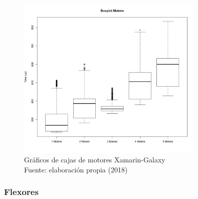 \begin{figure}[H]
  \begin{center} 
   	\includegraphics[width=0.8\textwidth]{evaluation/graphics/Xamarin/Galaxy/BoxplotMotorsXamarinGalaxy.png} 
    \caption[Gráficos de cajas de motores Xamarin-Galaxy]{Gráficos de cajas de motores Xamarin-Galaxy\\Fuente: elaboración propia (2018)} 
    \label{fig:xamarin-galaxy-boxplot-motors}
  \end{center}
\end{figure}

\subsubsection{Flexores}

